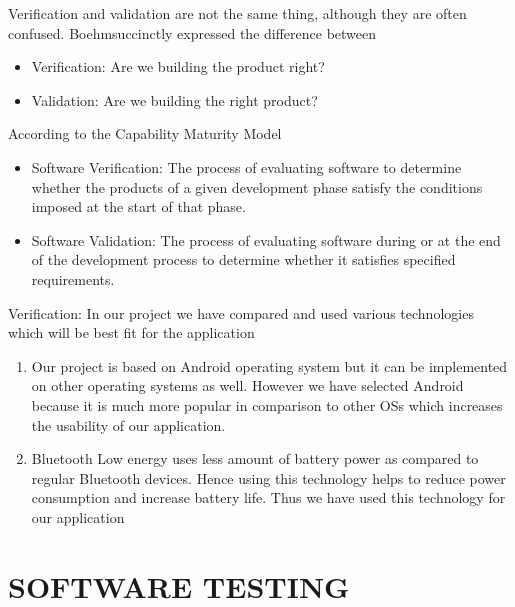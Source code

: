 \documentclass[12pt,a4paper]{report}
\begin{document}
\hspace{0.2 in}Verification and validation are not the same thing, although they are often confused. Boehmsuccinctly expressed the difference between
\begin{itemize}
	\item Verification: Are we building the product right?
	\item Validation: Are we building the right product?
\end{itemize}

\hspace{0.2 in}According to the Capability Maturity Model 
\begin{itemize}
	\item Software Verification: The process of evaluating software to determine whether the products of a given development phase satisfy the conditions imposed at the start of that phase. 
	\item Software Validation: The process of evaluating software during or at the end of the development process to determine whether it satisfies specified requirements.
\end{itemize}

\hspace{0.2 in}Verification: In our project we have compared and used various technologies which will be best fit for the application
\begin{enumerate}
	\item Our project is based on Android operating system but it can be implemented on other operating systems as well. However we have selected Android because it is much more popular in comparison to other OSs which increases the usability of our application.
	\item Bluetooth Low energy uses less amount of battery power as compared to regular Bluetooth devices. Hence using this technology helps to reduce power consumption and increase battery life. Thus we have used this technology for our application
\end{enumerate}

\chapter{SOFTWARE TESTING}
\newpage
\end{document}

